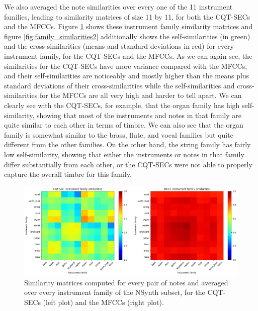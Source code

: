 \documentclass[journal]{IEEEtran}
\begin{document}
We also averaged the note similarities over every one of the 11 instrument families, leading to similarity matrices of size 11 by 11, for both the CQT-SECs and the MFCCs. Figure \ref{fig:family_similarities} shows these instrument family similarity matrices and figure \ref{fig:family_similarities2} additionally shows the self-similarities (in green) and the cross-similarities (means and standard deviations in red) for every instrument family, for the CQT-SECs and the MFCCs. As we can again see, the similarities for the CQT-SECs have more variance compared with the MFCCs, and their self-similarities are noticeably and mostly higher than the means plus standard deviations of their cross-similarities while the self-similarities and cross-similarities for the MFCCs are all very high and harder to tell apart. We can clearly see with the CQT-SECs, for example, that the organ family has high self-similarity, showing that most of the instruments and notes in that family are quite similar to each other in terms of timbre. We can also see that the organ family is somewhat similar to the brass, flute, and vocal families but quite different from the other families. On the other hand, the string family has fairly low self-similarity, showing that either the instruments or notes in that family differ substantially from each other, or the CQT-SECs were not able to properly capture the overall timbre for this family.

\begin{figure}[htp]
    \centering
    \includegraphics[width=\textwidth]{family_similarities.png}
    \caption{Similarity matrices computed for every pair of notes and averaged over every instrument family of the NSynth subset, for the CQT-SECs (left plot) and the MFCCs (right plot).}
    \label{fig:family_similarities}
\end{figure}
\end{document}

